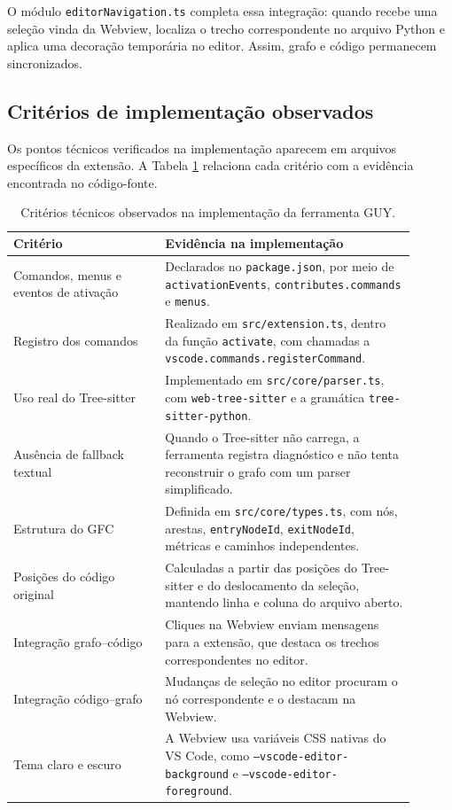 O módulo \texttt{editorNavigation.ts} completa essa integração: quando recebe uma seleção vinda da Webview, localiza o trecho correspondente no arquivo Python e aplica uma decoração temporária no editor. Assim, grafo e código permanecem sincronizados.

\subsection{Critérios de implementação observados}

Os pontos técnicos verificados na implementação aparecem em arquivos específicos da extensão. A Tabela \ref{tab:criterios_implementacao_guy} relaciona cada critério com a evidência encontrada no código-fonte.

\begin{table}[H]
    \centering
    \caption{Critérios técnicos observados na implementação da ferramenta GUY.}
    \begin{tabular}{p{0.34\linewidth} | p{0.56\linewidth}}
        \hline
        \textbf{Critério} & \textbf{Evidência na implementação} \\ \hline
        Comandos, menus e eventos de ativação & Declarados no \texttt{package.json}, por meio de \texttt{activationEvents}, \texttt{contributes.commands} e \texttt{menus}. \\ \hline
        Registro dos comandos & Realizado em \texttt{src/extension.ts}, dentro da função \texttt{activate}, com chamadas a \texttt{vscode.commands.registerCommand}. \\ \hline
        Uso real do Tree-sitter & Implementado em \texttt{src/core/parser.ts}, com \texttt{web-tree-sitter} e a gramática \texttt{tree-sitter-python}. \\ \hline
        Ausência de fallback textual & Quando o Tree-sitter não carrega, a ferramenta registra diagnóstico e não tenta reconstruir o grafo com um parser simplificado. \\ \hline
        Estrutura do GFC & Definida em \texttt{src/core/types.ts}, com nós, arestas, \texttt{entryNodeId}, \texttt{exitNodeId}, métricas e caminhos independentes. \\ \hline
        Posições do código original & Calculadas a partir das posições do Tree-sitter e do deslocamento da seleção, mantendo linha e coluna do arquivo aberto. \\ \hline
        Integração grafo--código & Cliques na Webview enviam mensagens para a extensão, que destaca os trechos correspondentes no editor. \\ \hline
        Integração código--grafo & Mudanças de seleção no editor procuram o nó correspondente e o destacam na Webview. \\ \hline
        Tema claro e escuro & A Webview usa variáveis CSS nativas do VS Code, como \texttt{--vscode-editor-background} e \texttt{--vscode-editor-foreground}. \\ \hline
    \end{tabular}
    \label{tab:criterios_implementacao_guy}
\end{table}


